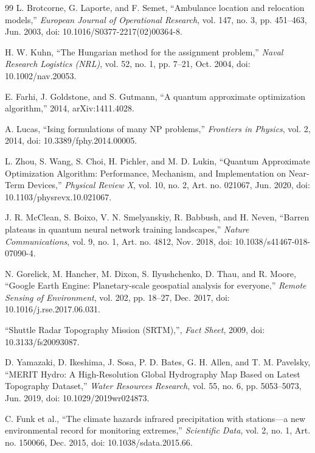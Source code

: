 \begin{thebibliography}{99}
L. Brotcorne, G. Laporte, and F. Semet, ``Ambulance location and relocation models,'' \emph{European Journal of Operational Research}, vol. 147, no. 3, pp. 451--463, Jun. 2003, doi: 10.1016/S0377-2217(02)00364-8.

H. W. Kuhn, ``The Hungarian method for the assignment problem,'' \emph{Naval Research Logistics (NRL)}, vol. 52, no. 1, pp. 7--21, Oct. 2004, doi: 10.1002/nav.20053.

E. Farhi, J. Goldstone, and S. Gutmann, ``A quantum approximate optimization algorithm,'' 2014, arXiv:1411.4028.

A. Lucas, ``Ising formulations of many NP problems,'' \emph{Frontiers in Physics}, vol. 2, 2014, doi: 10.3389/fphy.2014.00005.

L. Zhou, S. Wang, S. Choi, H. Pichler, and M. D. Lukin, ``Quantum Approximate Optimization Algorithm: Performance, Mechanism, and Implementation on Near-Term Devices,'' \emph{Physical Review X}, vol. 10, no. 2, Art. no. 021067, Jun. 2020, doi: 10.1103/physrevx.10.021067.

J. R. McClean, S. Boixo, V. N. Smelyanskiy, R. Babbush, and H. Neven, ``Barren plateaus in quantum neural network training landscapes,'' \emph{Nature Communications}, vol. 9, no. 1, Art. no. 4812, Nov. 2018, doi: 10.1038/s41467-018-07090-4.

N. Gorelick, M. Hancher, M. Dixon, S. Ilyushchenko, D. Thau, and R. Moore, ``Google Earth Engine: Planetary-scale geospatial analysis for everyone,'' \emph{Remote Sensing of Environment}, vol. 202, pp. 18--27, Dec. 2017, doi: 10.1016/j.rse.2017.06.031.

``Shuttle Radar Topography Mission (SRTM),'', \emph{Fact Sheet}, 2009, doi: 10.3133/fs20093087.

D. Yamazaki, D. Ikeshima, J. Sosa, P. D. Bates, G. H. Allen, and T. M. Pavelsky, ``MERIT Hydro: A High-Resolution Global Hydrography Map Based on Latest Topography Dataset,'' \emph{Water Resources Research}, vol. 55, no. 6, pp. 5053--5073, Jun. 2019, doi: 10.1029/2019wr024873.

C. Funk et al., ``The climate hazards infrared precipitation with stations---a new environmental record for monitoring extremes,'' \emph{Scientific Data}, vol. 2, no. 1, Art. no. 150066, Dec. 2015, doi: 10.1038/sdata.2015.66.


\end{thebibliography}
